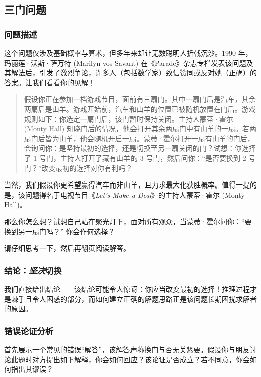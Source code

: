 \subsection{三门问题}

\subsubsection*{问题描述}

这个问题仅涉及基础概率与算术，但多年来却让无数聪明人折戟沉沙。1990 年，玛丽莲·沃斯·萨万特 (Marilyn vos Savant) 在《Parade》杂志专栏发表该问题及其解法后，引发了激烈争论，许多人（包括数学家）致信赞同或反对她（正确）的答案。让我们看看你的见解！

\begin{quote}
    假设你正在参加一档游戏节目，面前有三扇门。其中一扇门后是汽车，其余两扇后是山羊。游戏开始前，汽车和山羊的位置已被随机放置在门后。游戏规则如下：你选定一扇门后，该门暂时保持关闭。主持人蒙蒂·霍尔 (Monty Hall) 知晓门后的情况，他会打开其余两扇门中有山羊的一扇。若两扇门后皆为山羊，他会随机开启一扇。蒙蒂·霍尔打开一扇有山羊的门后，会询问你：是坚持最初的选择，还是切换至另一扇关闭的门？试想：你选择了 1 号门，主持人打开了藏有山羊的 3 号门，然后问你：``是否要换到 2 号门？''改变最初的选择对你有利吗？
\end{quote}

当然，我们假设你更希望赢得汽车而非山羊，且力求最大化获胜概率。值得一提的是，该问题得名于电视节目《\emph{Let's Make a Deal}》的主持人蒙蒂·霍尔 (Monty Hall)。

那么你怎么想？试想自己站在聚光灯下，面对所有观众，当蒙蒂·霍尔问你：``要换到另一扇门吗？'' 你会作何选择？

请仔细思考一下，然后再翻页阅读解答。

\clearpage

\subsubsection*{结论：\emph{坚决}切换}

我们直接给出结论——该结论可能令人惊讶：你应当改变最初的选择！推理过程才是棘手且令人困惑的部分，而如何建立正确的解题思路正是该问题长期困扰求解者的原因。

\subsubsection*{错误论证分析}

首先展示一个常见的错误``解答''，该解答声称换门与否无关紧要。假设你与朋友讨论此题时对方提出如下解释，你会如何回应？该论证是否成立？若不同意，你会如何指出其谬误？

